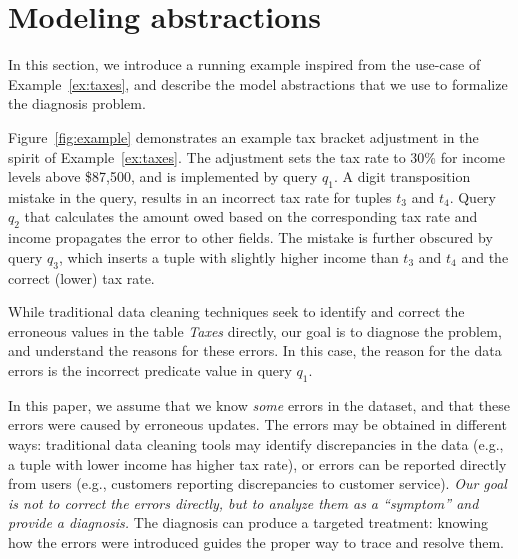 
\section{Modeling abstractions}
\label{sec:abstractions}

In this section, we introduce a running example inspired from the use-case of
Example~\ref{ex:taxes}, and describe the model abstractions that we use to
formalize the diagnosis problem.





\begin{example}\label{ex:taxes2}
    
Figure~\ref{fig:example} demonstrates an example tax bracket adjustment in the
spirit of Example~\ref{ex:taxes}. The adjustment sets the tax rate to 30\% for
income levels above \$87,500, and is implemented by query $q_1$. A digit
transposition mistake in the query, results in an incorrect tax rate for tuples
$t_3$ and $t_4$. Query $q_2$ that calculates the amount owed based on the corresponding
tax rate and income propagates the error to other fields. The mistake is
further obscured by query $q_3$, which inserts a tuple with slightly higher
income than $t_3$ and $t_4$ and the correct (lower) tax rate.

\end{example}
% 
While traditional data cleaning techniques seek to identify and correct the
erroneous values in the table \emph{Taxes} directly, our goal is to diagnose
the problem, and understand the reasons for these errors. In this case, the
reason for the data errors is the incorrect predicate value in query $q_1$.

In this paper, we assume that we know \emph{some} errors in the dataset, and
that these errors were caused by erroneous updates. The errors may be
obtained in different ways: traditional data cleaning tools may identify
discrepancies in the data (e.g., a tuple with lower income has higher tax
rate), or errors can be reported directly from users (e.g., customers
reporting discrepancies to customer service). \emph{Our goal is not to correct
the errors directly, but to analyze them as a ``symptom'' and provide a
diagnosis.} The diagnosis can produce a targeted treatment: knowing how the
errors were introduced guides the proper way to trace and resolve them.


